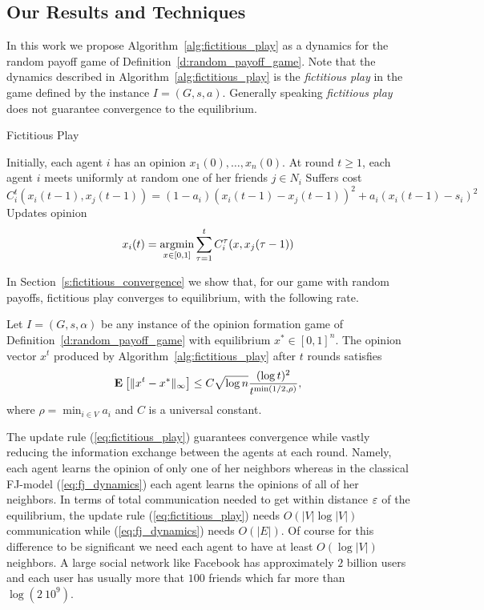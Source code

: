 \subsection{Our Results and Techniques}
In this work we propose Algorithm~\ref{alg:fictitious_play} as a dynamics
for the random payoff game of Definition~\ref{d:random_payoff_game}.
Note that the dynamics described in Algorithm~\ref{alg:fictitious_play} is the
\emph{fictitious play} in the game defined by the instance
$I=(G,s,a)$. Generally speaking \emph{fictitious play} does not guarantee
convergence to the equilibrium.
\begin{algorithm}
  \caption{Fictitious Play}
  \label{alg:fictitious_play}
  \begin{algorithmic}[1]
    \State Initially, each agent $i$ has an opinion $x_1(0),\ldots,x_n(0)$.
    \State At round $t \geq 1$, each agent $i$ meets uniformly at random one of
    her friends $j \in N_i$
    \State Suffers cost
    \(
      C^t_i(x_i(t-1),x_{j}(t-1))=(1-a_i)(x_i(t-1)
      -x_j(t-1))^2 + a_i(x_i(t-1)-s_i)^2
    \)
    \State Updates opinion
    \begin{equation}\label{eq:fictitious_play}
      x_i(t) =
      \operatorname*{argmin}_{x \in [0,1]}
      \sum_{\tau=1}^tC^{\tau}_i(x,x_j(\tau-1))
    \end{equation}
\end{algorithmic}
\end{algorithm}
In Section~\ref{s:fictitious_convergence} we show that, for our game with
random payoffs, fictitious play converges to equilibrium, with the following
rate.
\begin{theorem}\label{t:fictitious_convergence}
  Let $I = (G,s, \alpha)$ be any instance of the opinion formation
  game of Definition~\ref{d:random_payoff_game} with equilibrium
  $x^* \in [0,1]^n$.  The opinion vector $x^t$ produced by
  Algorithm~\ref{alg:fictitious_play} after $t$ rounds satisfies
  \[
    \bm{\mathrm{E}}_{} \left[ \| x^t - x^* \|_{\infty} \right] \leq
    C \sqrt{\log n}\frac{(\log t)^{2}}{t^{\min(1/2,\rho)}},
  \]
  where $\rho = \min_{i \in V} a_i$ and $C$ is a universal constant.
\end{theorem}
The update rule (\ref{eq:fictitious_play}) guarantees convergence
while vastly reducing the information exchange between the agents
at each round.
Namely, each agent learns the opinion of only one of her neighbors
whereas in the classical FJ-model (\ref{eq:fj_dynamics}) each agent
learns the opinions of all of her neighbors. In terms of
total communication needed to get within distance $\varepsilon$ of the
equilibrium, the update rule (\ref{eq:fictitious_play}) needs
$O(|V| \log |V|)$ communication while (\ref{eq:fj_dynamics}) needs
$O(|E|)$. Of course for this difference to be significant we need
each agent to have at least $O(\log |V|)$ neighbors.  A large social
network like Facebook has approximately $2$ billion users and each user
has usually more that $100$ friends which far more than $\log(2\ 10^9)$.

